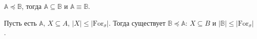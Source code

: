 \begin{stat}
    $\mathbb{A} \preceq \mathbb{B}$, тогда $\mathbb{A} \subseteq \mathbb{B}$ и $\mathbb{A} \equiv \mathbb{B}$. 
\end{stat}

\begin{theorem}
    Пусть есть $\mathbb{A}$, $X \subseteq A$, $|X| \leq |\text{For}_\sigma|$. Тогда существует $\mathbb{B} \preceq \mathbb{A}$: $X \subseteq B$ и $|\mathbb{B}| \leq |\text{For}_\sigma|$. 
\end{theorem}

